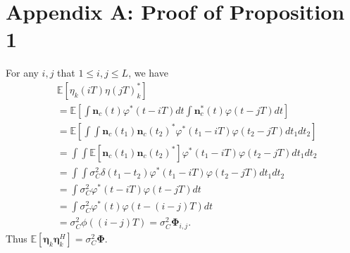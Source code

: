 \section*{Appendix A: Proof of Proposition 1}
\label{app:prop1}
For any $i,j$ that $1\leq i,j\leq L$, we have
\begin{equation}
\begin{aligned}
    &\mathbb{E}[\eta_k(iT)\eta(jT)_k^*] \\
    &=\mathbb{E}\left[\int\mathbf{n}_c(t)\varphi^{*}(t-iT)dt\int\mathbf{n}_c^*(t)\varphi(t-jT)dt\right] \\
    &=\mathbb{E}\left[\int\int\mathbf{n}_c(t_1)\mathbf{n}_c(t_2)^{*}\varphi^{*}(t_1-iT)\varphi(t_2-jT)dt_1dt_2\right] \\
    &=\int\int\mathbb{E}[\mathbf{n}_c(t_1)\mathbf{n}_c(t_2)^{*}]\varphi^{*}(t_1-iT)\varphi(t_2-jT)dt_1dt_2 \\
    &=\int\int\sigma_C^2\delta(t_1-t_2)\varphi^{*}(t_1-iT)\varphi(t_2-jT)dt_1dt_2 \\
    &=\int\sigma_C^2\varphi^{*}(t-iT)\varphi(t-jT)dt \\
    &=\int\sigma_C^2\varphi^{*}(t)\varphi(t-(i-j)T)dt \\
    &=\sigma_C^2\phi((i-j)T)=\sigma_C^2\mathbf{\Phi}_{i,j}.
\end{aligned}
\end{equation}
Thus $\mathbb{E}[\bm{\eta}_k\bm{\eta}_k^H]=\sigma_C^2\mathbf{\Phi}$.

